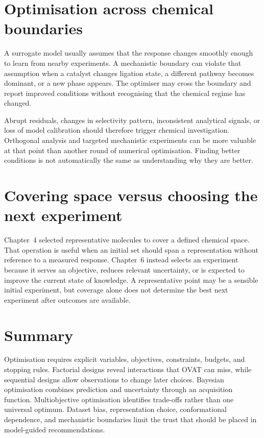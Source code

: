 \section{Optimisation across chemical boundaries}

A surrogate model usually assumes that the response changes smoothly enough to learn from nearby experiments.
A mechanistic boundary can violate that assumption when a catalyst changes ligation state, a different pathway becomes dominant, or a new phase appears.
The optimiser may cross the boundary and report improved conditions without recognising that the chemical regime has changed.

Abrupt residuals, changes in selectivity pattern, inconsistent analytical signals, or loss of model calibration should therefore trigger chemical investigation.
Orthogonal analysis and targeted mechanistic experiments can be more valuable at that point than another round of numerical optimisation.
Finding better conditions is not automatically the same as understanding why they are better.

\section{Covering space versus choosing the next experiment}

Chapter~4 selected representative molecules to cover a defined chemical space.
That operation is useful when an initial set should span a representation without reference to a measured response.
Chapter~6 instead selects an experiment because it serves an objective, reduces relevant uncertainty, or is expected to improve the current state of knowledge.
A representative point may be a sensible initial experiment, but coverage alone does not determine the best next experiment after outcomes are available.

\section{Summary}

Optimisation requires explicit variables, objectives, constraints, budgets, and stopping rules.
Factorial designs reveal interactions that OVAT can miss, while sequential designs allow observations to change later choices.
Bayesian optimisation combines prediction and uncertainty through an acquisition function.
Multiobjective optimisation identifies trade-offs rather than one universal optimum.
Dataset bias, representation choice, conformational dependence, and mechanistic boundaries limit the trust that should be placed in model-guided recommendations.
